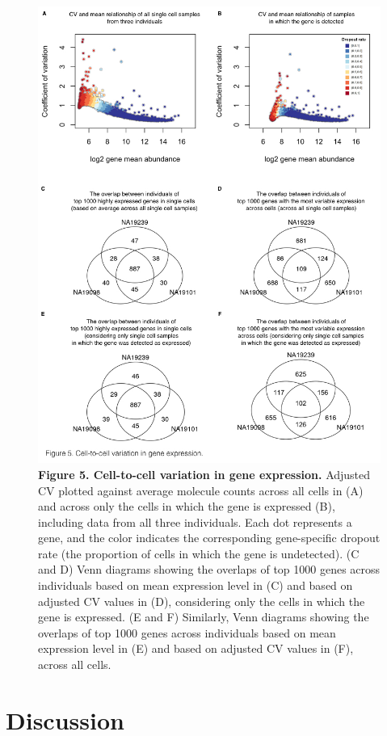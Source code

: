 \begin{figure}[htbp]
\centering
\includegraphics[width=5in]{img/ch04/Figure05.jpeg}
\caption{\textbf{Figure 5. Cell-to-cell variation in gene expression.}
Adjusted CV plotted against average molecule counts across all cells in
(A) and across only the cells in which the gene is expressed (B),
including data from all three individuals. Each dot represents a gene,
and the color indicates the corresponding gene-specific dropout rate
(the proportion of cells in which the gene is undetected). (C and D)
Venn diagrams showing the overlaps of top 1000 genes across individuals
based on mean expression level in (C) and based on adjusted CV values in
(D), considering only the cells in which the gene is expressed. (E and
F) Similarly, Venn diagrams showing the overlaps of top 1000 genes
across individuals based on mean expression level in (E) and based on
adjusted CV values in (F), across all cells.}
\end{figure}

\section{Discussion}\label{discussion}

